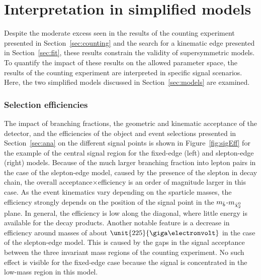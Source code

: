 \section{Interpretation in simplified models}
Despite the moderate excess seen in the results of the counting experiment presented in Section~\ref{sec:counting} and the search for a kinematic edge presented in Section~\ref{sec:fit}, these results constrain the validity of supersymmetric models. To quantify the impact of these results on the allowed parameter space, the results of the counting experiment are interpreted in specific signal scenarios. Here, the two simplified models discussed in Section~\ref{sec:models} are examined. 

\subsubsection{Selection efficiencies}
The impact of branching fractions, the geometric and kinematic acceptance of the detector, and the efficiencies of the object and event selections presented in Section~\ref{sec:ana} on the different signal points is shown in Figure~\ref{fig:sigEff} for the example of the central signal region for the fixed-edge (left) and slepton-edge (right) models. Because of the much larger branching fraction into lepton pairs in the case of the slepton-edge model, caused by the presence of the slepton in decay chain, the overall acceptance$\times$efficiency is an order of magnitude larger in this case. As the event kinematics vary depending on the sparticle masses, the efficiency strongly depends on the position of the signal point in the $m_{\tilde{b}}$-$m_{{\tilde{\chi}^0_2}}$ plane. In general, the efficiency is low along the diagonal, where little energy is available for the decay products. Another notable feature is a decrease in efficiency around \secondchi masses of about $\unit{225}{\giga\electronvolt}$ in the case of the slepton-edge model. This is caused by the gaps in the signal acceptance between the three invariant mass regions of the counting experiment. No such effect is visible for the fixed-edge case because the signal is concentrated in the low-mass region in this model.  
